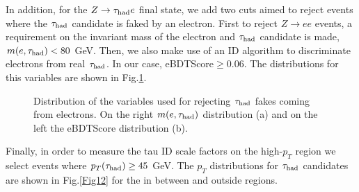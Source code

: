 In addition, for the $Z\to\tau_\text{had} e$ final state, we add two cuts aimed to reject events where the $\tau_\text{had}$ candidate is faked by an electron. First to reject $Z\to ee$ events, a requirement on the invariant mass of the electron and $\tau_\text{had}$ candidate is made, $m(e,\tau_\text{had})<80$ GeV. Then, we also make use of an ID algorithm to discriminate electrons from real $\tau_\text{had}$. In our case, eBDTScore$\geq 0.06$. The distributions for this variables are shown in Fig.\ref{Fig11}.
\begin{figure}[ht]
	\centering
	\hfill
	\caption{Distribution of the variables used for rejecting $\tau_\text{had}$ fakes coming from electrons. On the right $m(e,\tau_\text{had})$ distribution (a) and on the left the eBDTScore distribution (b).}
	\label{Fig11}
\end{figure}
Finally, in order to measure the tau ID scale factors on the high-$p_T$ region we select events where $p_T(\tau_\text{had})\geq 45$ GeV. The $p_T$ distributions for $\tau_\text{had}$ candidates are shown in Fig.\ref{Fig12} for the in between and outside regions.
